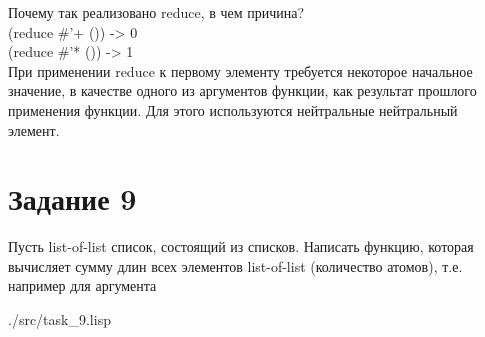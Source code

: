                                                                                                                                                                                                                                                                                                                                                                                                                                                                                                                                                                                                                                                                                                                                                                                                                                                                                                                                                                                                                                                                                                                                                                                                                                                                                                                                                                                                                                                                                                                                                                                                                                                                                                                              

Почему так реализовано reduce, в чем причина? \\
(reduce \#'+ ()) -> 0\\
(reduce \#'* ()) -> 1\\

При применении reduce к первому элементу требуется некоторое начальное значение, в качестве одного из аргументов функции, как результат прошлого применения функции. Для этого используются нейтральные нейтральный элемент.

\section*{Задание 9}

Пусть list-of-list список, состоящий из списков. Написать функцию, которая
вычисляет сумму длин всех элементов list-of-list (количество атомов), т.е. например
для аргумента

\begin{lstinputlisting}[
	caption={Задание 9},
	label={lst:t9},
	style={lsp},
	]{./src/task_9.lisp}
\end{lstinputlisting}